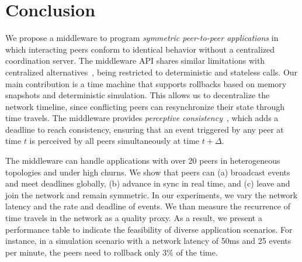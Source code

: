 \documentclass[10pt,journal,compsoc]{IEEEtran}
\begin{document}

\section{Conclusion}
\label{sec.conclusion}

We propose a middleware to program \emph{symmetric peer-to-peer applications}
in which interacting peers conform to identical behavior without a centralized
coordination server.
%
The middleware API shares similar limitations with centralized
alternatives~\cite{gals,croquet2}, being restricted to deterministic and
stateless calls. %
%
%
Our main contribution is a time machine that supports rollbacks based on memory
snapshots and deterministic simulation.
This allows us to decentralize the network timeline, since conflicting peers
can resynchronize their state through time travels.
%
%
The middleware provides \emph{perceptive consistency}~\cite{melding}, which
adds a deadline to reach consistency, ensuring that an event triggered by any
peer at time $t$ is perceived by all peers simultaneously at time $t+\Delta$.

The middleware can handle applications with over 20 peers in heterogeneous
topologies and under high churns.
%
We show that peers can
    (a) broadcast events and meet deadlines globally, 
    (b) advance in sync in real time, and
    (c) leave and join the network and remain symmetric.
%
In our experiments, we vary the network latency and the rate and deadline of
events.
We than measure the recurrence of time travels in the network as a quality
proxy.
%
As a result, we present a performance table to indicate the feasibility of
diverse application scenarios.
For instance, in a simulation scenario with a network latency of 50ms and 25
events per minute, the peers need to rollback only 3\% of the time.



\end{document}
